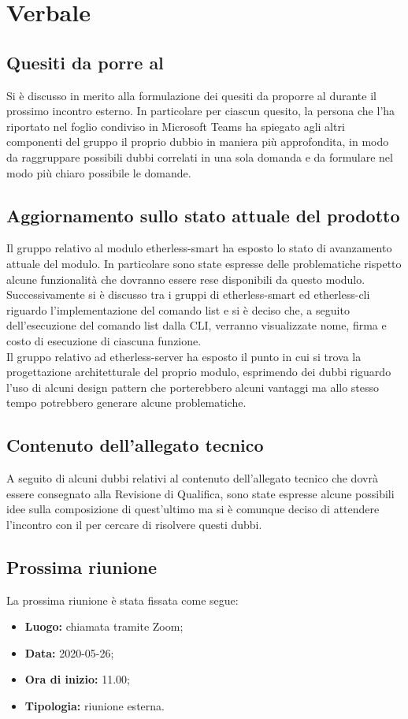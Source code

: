 \section{Verbale}
	\subsection{Quesiti da porre al \TV}
	Si è discusso in merito alla formulazione dei quesiti da proporre al \TV{} durante il prossimo incontro esterno.
	In particolare per ciascun quesito, la persona che l'ha riportato nel foglio condiviso in Microsoft Teams\textit{} ha spiegato agli altri componenti del gruppo il proprio dubbio in maniera più approfondita, in modo da raggruppare possibili dubbi correlati in una sola domanda e da formulare nel modo più chiaro possibile le domande.
	
	\subsection{Aggiornamento sullo stato attuale del prodotto}
	Il gruppo relativo al modulo etherless-smart ha esposto lo stato di avanzamento attuale del modulo.
	In particolare sono state espresse delle problematiche rispetto alcune funzionalità che dovranno essere rese disponibili da questo modulo. \\
	Successivamente si è discusso tra i gruppi di etherless-smart ed etherless-cli riguardo l'implementazione del comando list e si è deciso che, a seguito dell'esecuzione del comando list dalla CLI\textit{}, verranno visualizzate nome, firma e costo di esecuzione di ciascuna funzione. \\
	Il gruppo relativo ad etherless-server ha esposto il punto in cui si trova la progettazione architetturale del proprio modulo, esprimendo dei dubbi riguardo l'uso di alcuni design pattern che porterebbero alcuni vantaggi ma allo stesso tempo potrebbero generare alcune problematiche.
	
	\subsection{Contenuto dell'allegato tecnico}
	A seguito di alcuni dubbi relativi al contenuto dell'allegato tecnico che dovrà essere consegnato alla Revisione di Qualifica, sono state espresse alcune possibili idee sulla composizione di quest'ultimo ma si è comunque deciso di attendere l'incontro con il \RC{} per cercare di risolvere questi dubbi.
	
	\subsection{Prossima riunione}
		La prossima riunione è stata fissata come segue:
		\begin{itemize}
			\item \textbf{Luogo:} chiamata tramite Zoom; 
			\item \textbf{Data:} 2020-05-26;
			\item \textbf{Ora di inizio:} 11.00;
			\item \textbf{Tipologia:} riunione esterna.
		\end{itemize}
